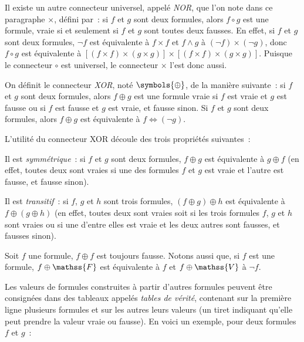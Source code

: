 Il existe un autre connecteur universel, appelé \emph{NOR}, que l'on note dans ce paragraphe $\times$, défini par : si $f$ et $g$ sont deux formules, alors $f \circ g$ est une formule, vraie si et seulement si $f$ et $g$ sont toutes deux fausses. 
En effet, si $f$ et $g$ sont deux formules, $\lnot f$ est équivalente à $f \times f$ et $f \wedge g$ à $(\lnot f) \times (\lnot g)$, donc $f \circ g$ est équivalente à $[(f \times f) \times (g \times g)] \times [(f \times f) \times (g \times g)]$. 
Puisque le connecteur $\circ$ est universel, le connecteur $\times$ l'est donc aussi.

\stopsubsection


\startsubsection[
  title=XOR, 
  reference=subsub:XOR]

On définit le connecteur \emph{XOR}, noté $\symbols{\oplus}$, de la manière suivante : si $f$ et $g$ sont deux formules, alors $f \oplus g$ est une formule vraie si $f$ est vraie et $g$ est fausse ou si $f$ est fausse et $g$ est vraie, et fausse sinon. 
Si $f$ et $g$ sont deux formules, alors $f \oplus g$ est équivalente à $f \Leftrightarrow (\lnot g)$. 

L'utilité du connecteur XOR découle des trois propriétés suivantes : 
\startitemize[nowhite]
  \item Il est \emph{symmétrique} : si $f$ et $g$ sont deux formules, $f \oplus g$ est équivalente à $g \oplus f$ (en effet, toutes deux sont vraies si une des formules $f$ et $g$ est vraie et l'autre est fausse, et fausse sinon).
  \item Il est \emph{transitif} : si $f$, $g$ et $h$ sont trois formules, $(f \oplus g) \oplus h$ est équivalente à $f \oplus (g \oplus h)$ (en effet, toutes deux sont vraies soit si les trois formules $f$, $g$ et $h$ sont vraies ou si une d'entre elles est vraie et les deux autres sont fausses, et fausses sinon).
  \item Soit $f$ une formule, $f \oplus f$ est toujours fausse.
\stopitemize
Notons aussi que, si $f$ est une formule, $f \oplus \mathss{F}$ est équivalente à $f$ et $f \oplus \mathss{V}$ à $\lnot f$.

\stopsubsection


\startsubsection[title=Tables de vérité]

Les valeurs de formules construites à partir d'autres formules peuvent être consignées dans des tableaux appelés \emph{tables de vérité}, contenant sur la première ligne plusieurs formules et sur les autres leurs valeurs (un tiret indiquant qu'elle peut prendre la valeur vraie ou fausse). 
En voici un exemple, pour deux formules $f$ et $g$ : 

